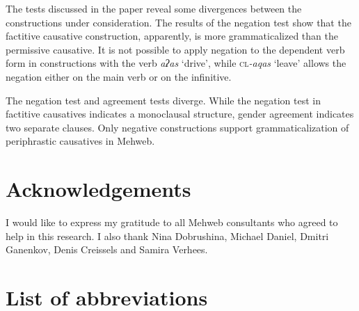 ﻿\documentclass[output=paper]{langsci/langscibook}
\begin{document}
The tests discussed in the paper reveal some divergences between the
constructions under consideration. The results of the negation test show
that the factitive causative construction, apparently, is more
grammaticalized than the permissive causative. It is not possible to
apply negation to the dependent verb form in constructions with the verb
\emph{aʔas} `drive', while \textsc{cl}\emph{-aqas} `leave' allows the
negation either on the main verb or on the infinitive.

The negation test and agreement tests diverge. While the negation test
in factitive causatives indicates a monoclausal structure, gender
agreement indicates two separate clauses. Only negative constructions
support grammaticalization of periphrastic causatives in Mehweb.



\section*{Acknowledgements}

I would like to express my gratitude to all Mehweb consultants who
agreed to help in this research. I also thank Nina
Dobrushina, Michael Daniel, Dmitri Ganenkov, Denis Creissels and
Samira Verhees.


\section*{List of abbreviations}
\end{document}
